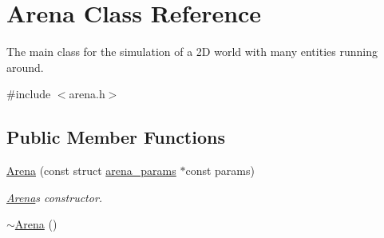 \hypertarget{class_arena}{}\section{Arena Class Reference}
\label{class_arena}


The main class for the simulation of a 2D world with many entities running around.  




{\ttfamily \#include $<$arena.\+h$>$}

\subsection*{Public Member Functions}
\begin{DoxyCompactItemize}
\item 
\hyperlink{class_arena_ac442d519facc5feebfd7612a53817e9a}{Arena} (const struct \hyperlink{structarena__params}{arena\+\_\+params} $\ast$const params)
\begin{DoxyCompactList}\small\item\em \hyperlink{class_arena}{Arena}\textquotesingle{}s constructor. \end{DoxyCompactList}\item 
\hyperlink{class_arena_ae21b399e9e3f6b8ac4ecc44d7d1667fc}{$\sim$\+Arena} ()\hypertarget{class_arena_ae21b399e9e3f6b8ac4ecc44d7d1667fc}{}\label{class_arena_ae21b399e9e3f6b8ac4ecc44d7d1667fc}


\end{DoxyCompactItemize}
